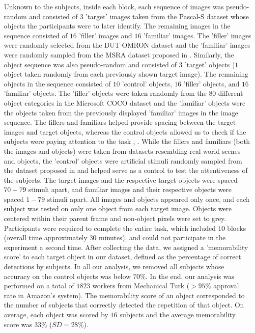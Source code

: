 Unknown to the subjects, inside each block, each sequence of images was pseudo-random and consisted of $3$ 'target' images taken from the Pascal-S dataset whose objects the participants were to later identify. The remaining images in the sequence consisted of $16$ 'filler' images and $16$ 'familiar' images. The 'filler' images were randomly selected from the DUT-OMRON dataset \cite{dutomron13} and the 'familiar' images were randomly sampled from the MSRA dataset proposed in \cite{msra11}. Similarly, the object sequence was also pseudo-random and consisted of $3$ 'target' objects ($1$ object taken randomly from each previously shown target image). The remaining objects in the sequence consisted of $10$ 'control' objects, $16$ 'filler' objects, and $16$ 'familiar' objects. The 'filler' objects were taken randomly from the $80$ different object categories in the Microsoft COCO dataset \cite{coco14} and the 'familiar' objects were the objects taken from the previously displayed 'familiar' images in the image sequence. The fillers and familiars helped provide spacing between the target images and target objects, whereas the control objects allowed us to check if the subjects were paying attention to the task \cite{brady08}, \cite{isola11}. While the fillers and familiars (both the images and objects) were taken from datasets resembling real world scenes and objects, the 'control' objects were artificial stimuli randomly sampled from the dataset proposed in \cite{brady08} and helped serve as a control to test the attentiveness of the subjects. The target images and the respective target objects were spaced $70-79$ stimuli apart, and familiar images and their respective objects were spaced $1-79$ stimuli apart. All images and objects appeared only once, and each subject was tested on only one object from each target image. Objects were centered within their parent frame and non-object pixels were set to grey. Participants were required to complete the entire task, which included $10$ blocks (overall time approximately $30$ minutes), and could not participate in the experiment a second time. After collecting the data, we assigned a 'memorability score' to each target object in our dataset, defined as the percentage of correct detections by subjects. In all our analysis, we removed all subjects whose accuracy on the control objects was below $70\%$. In the end, our analysis was performed on a total of {$1823$} workers from Mechanical Turk ($> 95\%$ approval rate in Amazon’s system).  The memorability score of an object corresponded to the number of subjects that correctly detected the repetition of that object. On average, each object was scored by $16$ subjects and the average memorability score was $33\%$ ($SD = 28\%$).
